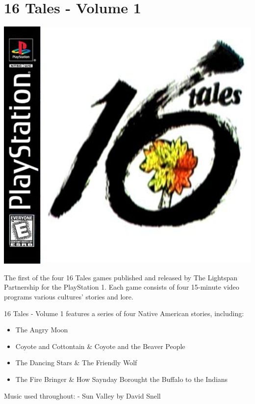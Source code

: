 \chapter{16 Tales - Volume 1}

\includegraphics[width=\textwidth/2]{"./Games/16Tales/Images/16TalesGeneralLogo.png"}

The first of the four 16 Tales games published and released by The Lightspan Partnership for the PlayStation 1. Each game consists of four 15-minute video programs various cultures' stories and lore.

16 Tales - Volume 1 features a series of four Native American stories, including:
\begin{itemize}
    \item The Angry Moon %
    \item Coyote and Cottontain \& Coyote and the Beaver People
    \item The Dancing Stars \& The Friendly Wolf
    \item The Fire Bringer \& How Saynday Borought the Buffalo to the Indians
\end{itemize}

Music used throughout:
- Sun Valley by David Snell

